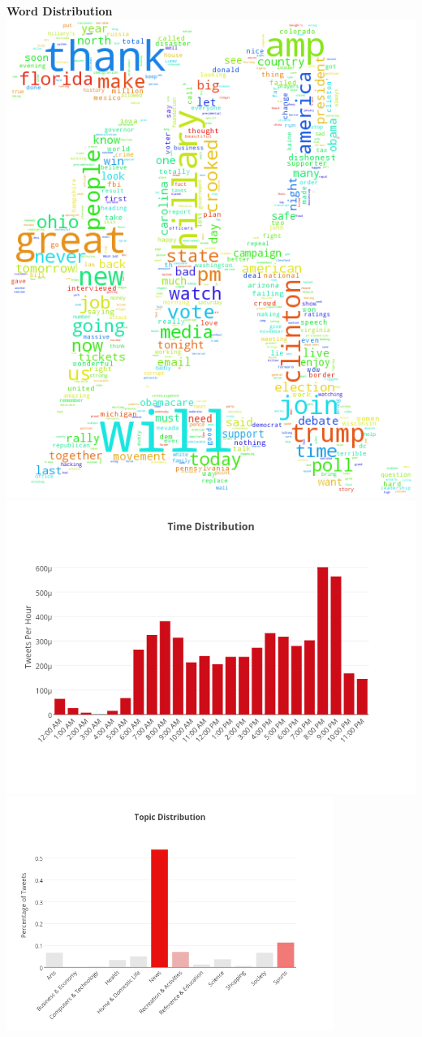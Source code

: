 \documentclass[12pt]{article}
\begin{document}
\begin{center}
\textbf{Word Distribution}\\
\bigbreak
\smallbreak
\includegraphics[width=0.6 \textwidth]{word_cloud.png}\\
\bigbreak
\includegraphics[width=0.8 \textwidth]{tweets_by_time.png}
\newpage
\includegraphics[width=0.8\textwidth]{topic_bar.png}\\
\end{center}
\end{document}
